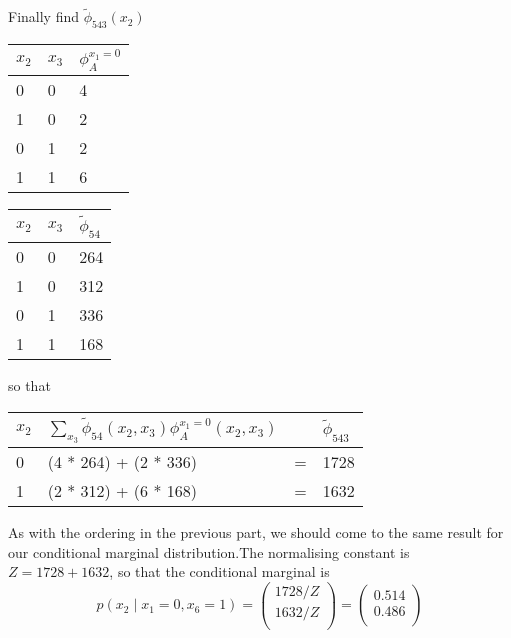 \begin{exenumerate}
\begin{solution}
    Finally find $\tilde{\phi}_{543}(x_2)$
    \begin{center}
      \begin{tabular}{lll}
        \toprule
        $x_2$ & $x_3$ & $\phi_A^{x_1=0}$\\
        \midrule
        0 & 0 & 4 \\
        1 & 0 & 2 \\
        0 & 1 & 2 \\
        1 & 1 & 6 \\
        \bottomrule
      \end{tabular}\hspace{2ex}
      \begin{tabular}{lll}
        \toprule
        $x_2$ & $x_3$ & $\tilde{\phi}_{54}$\\
        \midrule
        0 & 0 & 264 \\
        1 & 0 & 312 \\
        0 & 1 & 336 \\
        1 & 1 & 168 \\
        \bottomrule
      \end{tabular}
      \end{center}
    so that
    \begin{center}
      \begin{tabular}{llll}
        \toprule
        $x_2$ & $\sum_{x_3} \tilde{\phi}_{54}(x_2, x_3) \phi_A^{x_1=0}(x_2,x_3)$ &  & $\tilde{\phi}_{543}$\\
        \midrule
        0 & (4 * 264) + (2 * 336) & = & 1728 \\
        1 & (2 * 312) + (6 * 168) & = & 1632 \\
        \bottomrule
      \end{tabular}
    \end{center}

    As with the ordering in the previous part, we should come to the
    same result for our conditional marginal distribution.The
    normalising constant is $Z = 1728 + 1632$, so that the conditional
    marginal is
    \begin{equation}
      p(x_2 \mid x_1=0, x_6=1) = 
      \begin{pmatrix}
        1728 / Z \\
        1632 / Z \\
      \end{pmatrix} = 
      \begin{pmatrix}
        0.514 \\
        0.486 \\
      \end{pmatrix}
    \end{equation}


\end{solution}
\end{exenumerate}
